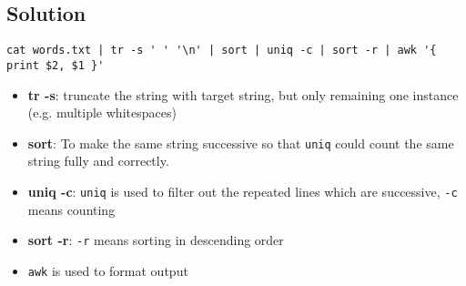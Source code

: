 \subsection{Solution}
\begin{mdframed}[style=mymdf]
\begin{lstlisting}[style=customc]
cat words.txt | tr -s ' ' '\n' | sort | uniq -c | sort -r | awk '{ print $2, $1 }'
\end{lstlisting}
\end{mdframed}
\begin{itemize}
\item \textbf{tr -s}: truncate the string with target string, but only remaining one instance (e.g. multiple whitespaces)
\item \textbf{sort}: To make the same string successive so that \texttt{uniq} could count the same string fully and correctly.
\item \textbf{uniq -c}: \texttt{uniq} is used to filter out the repeated lines which are successive, \texttt{-c} means counting
\item \textbf{sort -r}: \texttt{-r} means sorting in descending order
\item \texttt{awk} is used to format output
\end{itemize}
